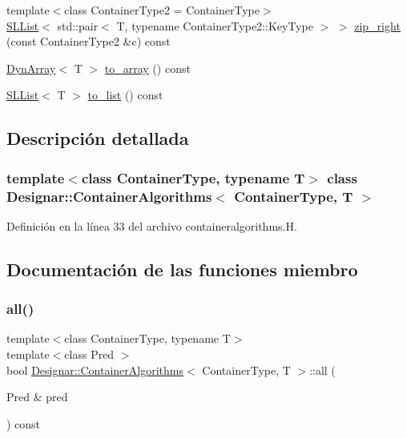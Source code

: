 \begin{DoxyCompactItemize}
\item 
{\footnotesize template$<$class Container\+Type2  = Container\+Type$>$ }\\\hyperlink{class_designar_1_1_s_l_list}{S\+L\+List}$<$ std\+::pair$<$ T, typename Container\+Type2\+::\+Key\+Type $>$ $>$ \hyperlink{class_designar_1_1_container_algorithms_aafb9d5320b99e9d39ed470b5b295f8b1}{zip\+\_\+right} (const Container\+Type2 \&c) const
\item 
\hyperlink{class_designar_1_1_dyn_array}{Dyn\+Array}$<$ T $>$ \hyperlink{class_designar_1_1_container_algorithms_a2a358d26ad630d1bb5995bff81f66bc4}{to\+\_\+array} () const
\item 
\hyperlink{class_designar_1_1_s_l_list}{S\+L\+List}$<$ T $>$ \hyperlink{class_designar_1_1_container_algorithms_a7800ec47f0b49c369f7341f72c70692a}{to\+\_\+list} () const
\end{DoxyCompactItemize}


\subsection{Descripción detallada}
\subsubsection*{template$<$class Container\+Type, typename T$>$\newline
class Designar\+::\+Container\+Algorithms$<$ Container\+Type, T $>$}



Definición en la línea 33 del archivo containeralgorithms.\+H.



\subsection{Documentación de las funciones miembro}
\mbox{\label{class_designar_1_1_container_algorithms_a81f6c5f0fa93c2ef34cd8636f503bdf3}} 
\subsubsection{\texorpdfstring{all()}{all()}\hspace{0.1cm}{\footnotesize\ttfamily [1/2]}}
{\footnotesize\ttfamily template$<$class Container\+Type, typename T$>$ \\
template$<$class Pred $>$ \\
bool \hyperlink{class_designar_1_1_container_algorithms}{Designar\+::\+Container\+Algorithms}$<$ Container\+Type, T $>$\+::all (\begin{DoxyParamCaption}\item[{Pred \&}]{pred }\end{DoxyParamCaption}) const\hspace{0.3cm}{\ttfamily [inline]}}



